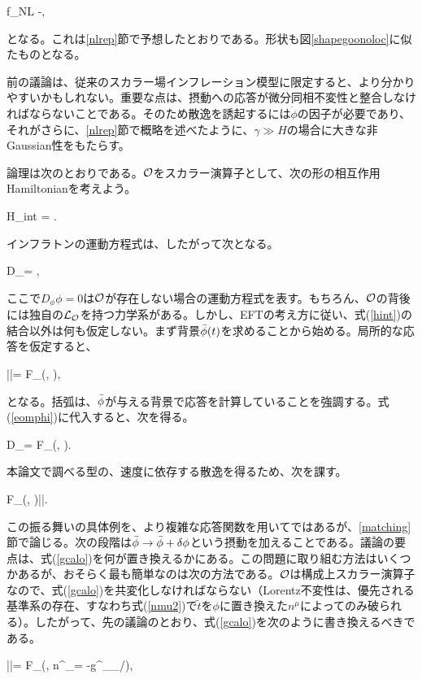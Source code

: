 \beq
f_{\rm NL} \simeq -,
\eeq

となる。これは\ref{nlrep}節で予想したとおりである。形状も図\ref{shapegoonoloc}に似たものとなる。

前の議論は、従来のスカラー場インフレーション模型に限定すると、より分かりやすいかもしれない。重要な点は、摂動への応答が微分同相不変性と整合しなければならないことである。そのため散逸を誘起するには$\dot\phi$の因子が必要であり、それがさらに、\ref{nlrep}節で概略を述べたように、$\gamma\gg H$の場合に大きな非Gaussian性をもたらす。

論理は次のとおりである。${\cal O}$をスカラー演算子として、次の形の相互作用Hamiltonianを考えよう。

\beq
H_{\rm int} = \phi\; \calo \label{hint}.
\eeq

インフラトンの運動方程式は、したがって次となる。

\beq
\label{eomphi}
D_\phi \phi = \calo,
\eeq

ここで$D_\phi\phi=0$は${\cal O}$が存在しない場合の運動方程式を表す。もちろん、${\cal O}$の背後には独自の${\cal L}_{\cal O}$を持つ力学系がある。しかし、EFTの考え方に従い、式(\ref{hint})の結合以外は何も仮定しない。まず背景${\bar\phi}(t)$を求めることから始める。局所的な応答を仮定すると、

\beq
\label{gcalo}
\langle \bphi|\calo |\bphi\rangle = F_\calo(\bphi, \dot{\bphi}),
\eeq

となる。括弧は、${\bar\phi}$が与える背景で応答を計算していることを強調する。式(\ref{eomphi})に代入すると、次を得る。

\beq
\label{dphibpi}
D_\phi \bphi = F_\calo(\bphi, \dot{\bphi}).
\eeq

本論文で調べる型の、速度に依存する散逸を得るため、次を課す。

\beq
\label{fphip}
 F_\calo(\bphi, \dot{\bphi})\simeq |\dot\bphi|.
\eeq

この振る舞いの具体例を、より複雑な応答関数を用いてではあるが、\ref{matching}節で論じる。次の段階は${\bar\phi}\to{\bar\phi}+\delta\phi$という摂動を加えることである。議論の要点は、式(\ref{gcalo})を何が置き換えるかにある。この問題に取り組む方法はいくつかあるが、おそらく最も簡単なのは次の方法である。${\cal O}$は構成上スカラー演算子なので、式(\ref{gcalo})を共変化しなければならない（Lorentz不変性は、優先される基準系の存在、すなわち式(\ref{nmu2})で$\tilde t$を$\phi$に置き換えた$n^\mu$によってのみ破られる）。したがって、先の議論のとおり、式(\ref{gcalo})を次のように書き換えるべきである。

\beq
\label{gcalo2}
\langle \phi|\calo |\phi\rangle = F_\calo\left(\phi, n^\mu \partial_\mu \phi = -g^{\mu\nu}\partial_\nu\phi\partial_\mu\phi/\right),
\eeq

